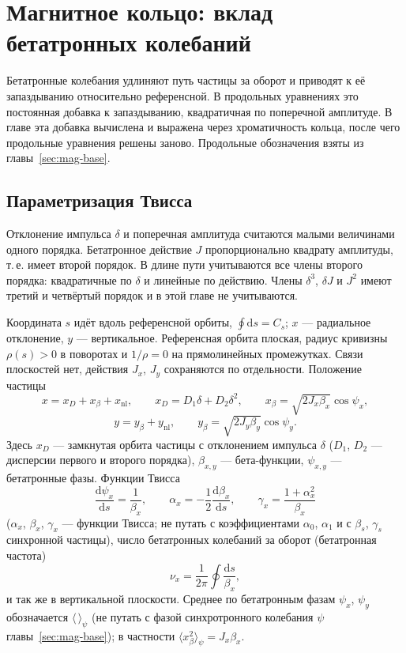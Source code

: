 \section{Магнитное кольцо: вклад бетатронных колебаний}
\label{sec:mag-beta}

Бетатронные колебания удлиняют путь частицы за оборот и приводят к её запаздыванию относительно референсной. В продольных уравнениях это постоянная добавка к запаздыванию, квадратичная по поперечной амплитуде. В главе эта добавка вычислена и выражена через хроматичность кольца, после чего продольные уравнения решены заново. Продольные обозначения взяты из главы~\ref{sec:mag-base}.

\subsection{Параметризация Твисса}

Отклонение импульса $\delta$ и поперечная амплитуда считаются малыми величинами одного порядка. Бетатронное действие $J$ пропорционально квадрату амплитуды, т.\,е. имеет второй порядок. В длине пути учитываются все члены второго порядка: квадратичные по $\delta$ и линейные по действию. Члены $\delta^3$, $\delta J$ и $J^2$ имеют третий и четвёртый порядок и в этой главе не учитываются.

Координата $s$ идёт вдоль референсной орбиты, $\oint\mathrm{d}s=C_s$; $x$ --- радиальное отклонение, $y$ --- вертикальное. Референсная орбита плоская, радиус кривизны $\rho(s)>0$ в поворотах и $1/\rho=0$ на прямолинейных промежутках. Связи плоскостей нет, действия $J_x$, $J_y$ сохраняются по отдельности. Положение частицы
\begin{equation}
\label{eq:xbeta}
x=x_D+x_\beta+x_{\mathrm{nl}},
\qquad
x_D=D_1\delta+D_2\delta^2,
\qquad
x_\beta=\sqrt{2J_x\beta_x}\cos\psi_x,
\end{equation}
\begin{equation}
\label{eq:ybeta}
y=y_\beta+y_{\mathrm{nl}},
\qquad
y_\beta=\sqrt{2J_y\beta_y}\cos\psi_y.
\end{equation}
Здесь $x_D$ --- замкнутая орбита частицы с отклонением импульса $\delta$ ($D_1$, $D_2$ --- дисперсии первого и второго порядка), $\beta_{x,y}$ --- бета-функции, $\psi_{x,y}$ --- бетатронные фазы. Функции Твисса
\begin{equation}
\label{eq:twiss-x}
\frac{\mathrm{d}\psi_x}{\mathrm{d}s}=\frac{1}{\beta_x},
\qquad
\alpha_x=-\frac{1}{2}\frac{\mathrm{d}\beta_x}{\mathrm{d}s},
\qquad
\gamma_x=\frac{1+\alpha_x^2}{\beta_x}
\end{equation}
($\alpha_x$, $\beta_x$, $\gamma_x$ --- функции Твисса; не путать с коэффициентами $\alpha_0$, $\alpha_1$ и с $\beta_s$, $\gamma_s$ синхронной частицы), число бетатронных колебаний за оборот (бетатронная частота)
\begin{equation}
\label{eq:nu-def}
\nu_x=\frac{1}{2\pi}\oint\frac{\mathrm{d}s}{\beta_x},
\end{equation}
и так же в вертикальной плоскости. Среднее по бетатронным фазам $\psi_x$, $\psi_y$ обозначается $\langle\,\rangle_\psi$ (не путать с фазой синхротронного колебания $\psi$ главы~\ref{sec:mag-base}); в частности $\langle x_\beta^2\rangle_\psi=J_x\beta_x$.

